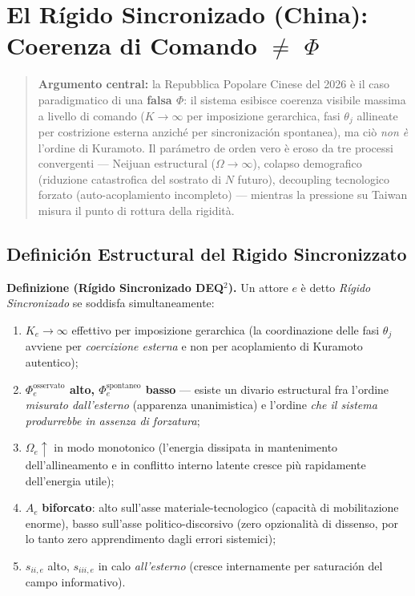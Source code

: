 \chapter{\texorpdfstring{El Rígido Sincronizado (China): Coerenza di
Comando $\neq$
\(\Phi\)}{El Rígido Sincronizado (China): Coerenza di Comando $\neq$ \textbackslash Phi}}\label{il-rigido-sincronizzato-cina-coerenza-di-comando-phi}

\begin{quote}
\textbf{Argumento central:} la Repubblica Popolare Cinese del 2026 è il
caso paradigmatico di una \textbf{falsa \(\Phi\)}: il sistema esibisce
coerenza visibile massima a livello di comando (\(K \to \infty\) per
imposizione gerarchica, fasi \(\theta_j\) allineate per costrizione
esterna anziché per sincronización spontanea), ma ciò \emph{non è}
l'ordine di Kuramoto. Il parámetro de orden vero è eroso da tre processi
convergenti --- Neijuan estructural (\(\Omega \to \infty\)), colapso
demografico (riduzione catastrofica del sostrato di \(N\) futuro),
decoupling tecnologico forzato (auto-acoplamiento incompleto) ---
mientras la pressione su Taiwan misura il punto di rottura della rigidità.
\end{quote}



\section{Definición Estructural del Rigido
Sincronizzato}\label{definición-estructural-del-rigido-sincronizzato}

\Hypoth{} \textbf{Definizione (Rígido Sincronizado DEQ$^2$).} Un attore
\(e\) è detto \emph{Rígido Sincronizado} se soddisfa simultaneamente:

\begin{enumerate}
\def\labelenumi{\arabic{enumi}.}
\tightlist
\item
  \(K_e \to \infty\) effettivo per imposizione gerarchica (la
  coordinazione delle fasi \(\theta_j\) avviene per \emph{coercizione
  esterna} e non per acoplamiento di Kuramoto autentico);
\item
  \textbf{\(\Phi_e^{\text{osservato}}\) alto,
  \(\Phi_e^{\text{spontaneo}}\) basso} --- esiste un divario estructural
  fra l'ordine \emph{misurato dall'esterno} (apparenza unanimistica) e
  l'ordine \emph{che il sistema produrrebbe in assenza di forzatura};
\item
  \(\Omega_e \uparrow\) in modo monotonico (l'energia dissipata in
  mantenimento dell'allineamento e in conflitto interno latente cresce
  più rapidamente dell'energia utile);
\item
  \(A_e\) \textbf{biforcato}: alto sull'asse materiale-tecnologico
  (capacità di mobilitazione enorme), basso sull'asse
  politico-discorsivo (zero opzionalità di dissenso, por lo tanto zero
  apprendimento dagli errori sistemici);
\item
  \(s_{ii,e}\) alto, \(s_{iii,e}\) in calo \emph{all'esterno} (cresce
  internamente per saturación del campo informativo).
\end{enumerate}

